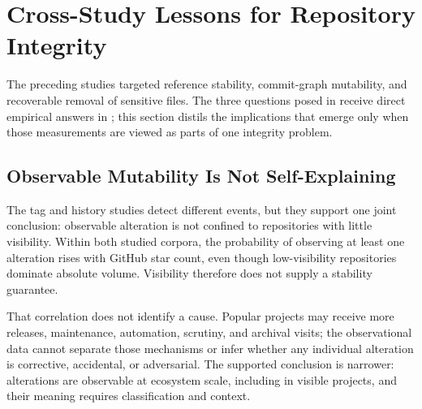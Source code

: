 


\section{Cross-Study Lessons for Repository Integrity}
\label{sec:concl-synthesis}

The preceding studies targeted reference stability, commit-graph mutability, and recoverable removal of sensitive files.
The three questions posed in  receive direct empirical answers in ; this section distils the implications that emerge only when those measurements are viewed as parts of one integrity problem.

\subsection{Observable Mutability Is Not Self-Explaining}
\label{subsec:concl-mutability-norm}

The tag and history studies detect different events, but they support one joint conclusion: observable alteration is not confined to repositories with little visibility.
Within both studied corpora, the probability of observing at least one alteration rises with GitHub star count, even though low-visibility repositories dominate absolute volume.
Visibility therefore does not supply a stability guarantee.

That correlation does not identify a cause.
Popular projects may receive more releases, maintenance, automation, scrutiny, and archival visits; the observational data cannot separate those mechanisms or infer whether any individual alteration is corrective, accidental, or adversarial.
The supported conclusion is narrower: alterations are observable at ecosystem scale, including in visible projects, and their meaning requires classification and context.

